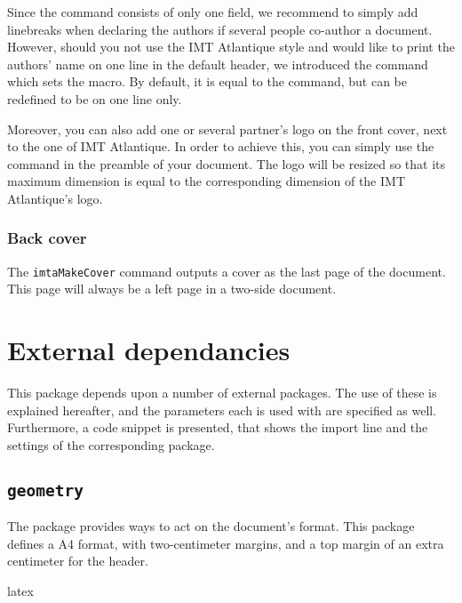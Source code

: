 \documentclass{report}
\begin{document}
Since the  command consists of only one field, we recommend to simply add linebreaks when declaring the authors if several people co-author a document. However, should you not use the IMT Atlantique style and would like to print the authors' name on one line in the default header, we introduced the  command which sets the  macro. By default, it is equal to the  command, but can be redefined to be on one line only.

Moreover, you can also add one or several partner's logo on the front cover, next to the one of IMT Atlantique. In order to achieve this, you can simply use the  command in the preamble of your document. The logo will be resized so that its maximum dimension is equal to the corresponding dimension of the IMT Atlantique's logo.


\subsubsection{Back cover}

The \texttt{imtaMakeCover} command outputs a cover as the last page of the document.
This page will always be a left page in a two-side document.



\section{External dependancies}

This package depends upon a number of external packages.
The use of these is explained hereafter, and the parameters each is used with are specified as well.
Furthermore, a code snippet is presented, that shows the import line and the settings of the corresponding package.

\subsection{\texttt{geometry}}

The  package provides ways to act on the document's format.
This package defines a A4 format, with two-centimeter margins, and a top margin of an extra centimeter for the header.

\begin{imtaCode}{latex}
\RequirePackage[a4paper, margin=2cm, top=3cm]{geometry}
\end{imtaCode}
\end{document}
